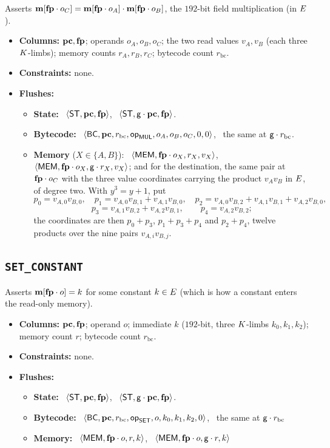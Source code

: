 Asserts $\mathbf{m}[\mathbf{fp}\cdot o_C]=\mathbf{m}[\mathbf{fp}\cdot o_A] \cdot \mathbf{m}[\mathbf{fp}\cdot o_B]$, the $192$-bit field multiplication (in $E$).
\begin{itemize}
\item \textbf{Columns:} $\mathbf{pc},\mathbf{fp}$; operands $o_A,o_B,o_C$; the two read values $v_A,v_B$ (each three $K$-limbs); memory counts $r_A,r_B,r_C$; bytecode count $r_{\mathrm{bc}}$.
\item \textbf{Constraints:} none.
\item \textbf{Flushes:}
  \begin{itemize}
  \item \textbf{State:} \pull\ $\langle \mathsf{ST},\mathbf{pc},\mathbf{fp} \rangle$, \push\ $\langle \mathsf{ST},\mathsf{g}\cdot\mathbf{pc},\mathbf{fp} \rangle$.
  \item \textbf{Bytecode:} \pull\ $\langle \mathsf{BC},\mathbf{pc},r_{\mathrm{bc}},\mathsf{op}_{\mathsf{MUL}},o_A,o_B,o_C,0,0 \rangle$, \push\ the same at $\mathsf{g}\cdot r_{\mathrm{bc}}$.
  \item \textbf{Memory} ($X\in\{A,B\}$): \pull\ $\langle \mathsf{MEM},\mathbf{fp}\cdot o_X,r_X,v_X \rangle$, \push\ $\langle \mathsf{MEM},\mathbf{fp}\cdot o_X,\mathsf{g}\cdot r_X,v_X \rangle$; and for the destination, the same pair at $\mathbf{fp}\cdot o_C$ with the three value coordinates carrying the product $v_Av_B$ in $E$, of degree two. With $y^3=y+1$, put
    \[
    p_0=v_{A,0}v_{B,0},\quad
    p_1=v_{A,0}v_{B,1}+v_{A,1}v_{B,0},\quad
    p_2=v_{A,0}v_{B,2}+v_{A,1}v_{B,1}+v_{A,2}v_{B,0},
    \]
    \[
    p_3=v_{A,1}v_{B,2}+v_{A,2}v_{B,1},\qquad
    p_4=v_{A,2}v_{B,2};
    \]
    the coordinates are then $p_0+p_3$, $p_1+p_3+p_4$ and $p_2+p_4$, twelve products over the nine pairs $v_{A,i}v_{B,j}$.
  \end{itemize}
\end{itemize}

\subsection{\texttt{SET\_CONSTANT}}\label{sec:tab-set}

Asserts $\mathbf{m}[\mathbf{fp}\cdot o]=k$ for some constant $k \in E$ (which is how a constant enters the read-only memory).
\begin{itemize}
\item \textbf{Columns:} $\mathbf{pc},\mathbf{fp}$; operand $o$; immediate $k$ ($192$-bit, three $K$-limbs $k_0,k_1,k_2$); memory count $r$; bytecode count $r_{\mathrm{bc}}$.
\item \textbf{Constraints:} none.
\item \textbf{Flushes:}
  \begin{itemize}
  \item \textbf{State:} \pull\ $\langle \mathsf{ST},\mathbf{pc},\mathbf{fp} \rangle$, \push\ $\langle \mathsf{ST},\mathsf{g}\cdot\mathbf{pc},\mathbf{fp} \rangle$.
  \item \textbf{Bytecode:} \pull\ $\langle \mathsf{BC},\mathbf{pc},r_{\mathrm{bc}},\mathsf{op}_{\mathsf{SET}},o,k_0,k_1,k_2,0 \rangle$, \push\ the same at $\mathsf{g}\cdot r_{\mathrm{bc}}$ 
  \item \textbf{Memory:} \pull\ $\langle \mathsf{MEM},\mathbf{fp}\cdot o,r,k \rangle$, \push\ $\langle \mathsf{MEM},\mathbf{fp}\cdot o,\mathsf{g}\cdot r,k \rangle$ 
  \end{itemize}
\end{itemize}

